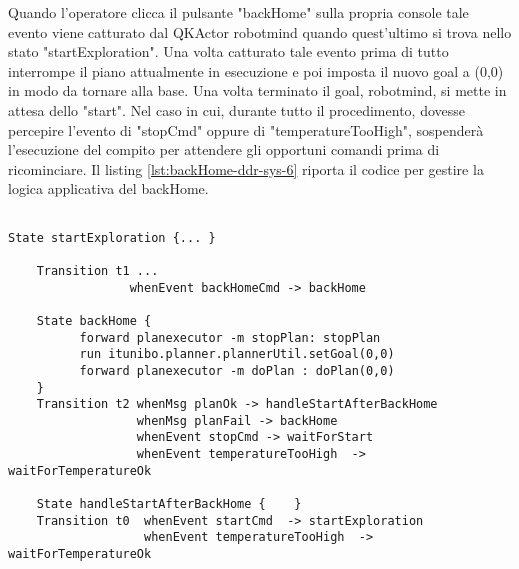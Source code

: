Quando l'operatore clicca il pulsante "backHome" sulla propria console tale evento viene catturato dal QKActor robotmind quando quest'ultimo si trova nello stato "startExploration". Una volta catturato tale evento prima di tutto interrompe il piano attualmente in esecuzione e poi imposta il nuovo goal a (0,0) in modo da tornare alla base. Una volta terminato il goal, robotmind, si mette in attesa dello "start". Nel caso in cui, durante tutto il procedimento, dovesse percepire l'evento di "stopCmd" oppure di "temperatureTooHigh", sospenderà l'esecuzione del compito per attendere gli opportuni comandi prima di ricominciare.
Il listing \ref{lst:backHome-ddr-sys-6} riporta il codice per gestire la logica applicativa del backHome.

\begin{lstlisting}[backgroundcolor=\color{white}, label={lst:backHome-ddr-sys-6}, caption={"Codice di robotmind per la gestione del backHome"}]

State startExploration {... } 

	Transition t1 ...
	             whenEvent backHomeCmd -> backHome

	State backHome {
		  forward planexecutor -m stopPlan: stopPlan
		  run itunibo.planner.plannerUtil.setGoal(0,0)
		  forward planexecutor -m doPlan : doPlan(0,0)   
	}
	Transition t2 whenMsg planOk -> handleStartAfterBackHome 
			      whenMsg planFail -> backHome
			      whenEvent stopCmd -> waitForStart
			      whenEvent temperatureTooHigh  -> waitForTemperatureOk
	
	State handleStartAfterBackHome {	}
	Transition t0  whenEvent startCmd  -> startExploration
				   whenEvent temperatureTooHigh  -> waitForTemperatureOk

\end{lstlisting}


